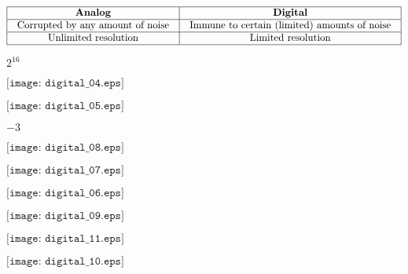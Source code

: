 \documentclass[12pt,a4paper,margin=2cm]{book}
\def\lthtmlcheckvsize{\ifdim\ht\sizebox<\vsize 
  \ifdim\wd\sizebox<\hsize\expandafter\hfill\fi \expandafter\vfill
  \else\expandafter\vss\fi}%
\begin{document}
{\newpage\clearpage
{}%
$\displaystyle \vbox{\offinterlineskip
\halign{\strut
\vrule \quad\hfil # \  \hfil & 
\vrule \quad\hfil # \  \hfil \vrule \cr
\noalign{\hrule }
\textbf{Analog} & \textbf{Digital} \cr
\noalign{\hrule }
Corrupted by any amount of noise & Immune to certain (limited) amounts of noise \cr
\noalign{\hrule }
Unlimited resolution & Limited resolution \cr
\noalign{\hrule }
} %
}$%
\lthtmlindisplaymathZ
\lthtmlcheckvsize\clearpage}

{\newpage\clearpage
{}%
$ 2^{16}$%
\lthtmlindisplaymathZ
\lthtmlcheckvsize\clearpage}

{\newpage\clearpage
{}%
$\displaystyle \texttt{[image: digital\_04.eps]}$%
\lthtmlindisplaymathZ
\lthtmlcheckvsize\clearpage}

{\newpage\clearpage
{}%
$\displaystyle \texttt{[image: digital\_05.eps]}$%
\lthtmlindisplaymathZ
\lthtmlcheckvsize\clearpage}

{\newpage\clearpage
{}%
$ -3$%
\lthtmlindisplaymathZ
\lthtmlcheckvsize\clearpage}

{\newpage\clearpage
{}%
$\displaystyle \texttt{[image: digital\_08.eps]}$%
\lthtmlindisplaymathZ
\lthtmlcheckvsize\clearpage}

{\newpage\clearpage
{}%
$\displaystyle \texttt{[image: digital\_07.eps]}$%
\lthtmlindisplaymathZ
\lthtmlcheckvsize\clearpage}

{\newpage\clearpage
{}%
$\displaystyle \texttt{[image: digital\_06.eps]}$%
\lthtmlindisplaymathZ
\lthtmlcheckvsize\clearpage}

{\newpage\clearpage
{}%
$\displaystyle \texttt{[image: digital\_09.eps]}$%
\lthtmlindisplaymathZ
\lthtmlcheckvsize\clearpage}

{\newpage\clearpage
{}%
$\displaystyle \texttt{[image: digital\_11.eps]}$%
\lthtmlindisplaymathZ
\lthtmlcheckvsize\clearpage}

{\newpage\clearpage
{}%
$\displaystyle \texttt{[image: digital\_10.eps]}$%
\lthtmlindisplaymathZ
\lthtmlcheckvsize\clearpage}
\end{document}
